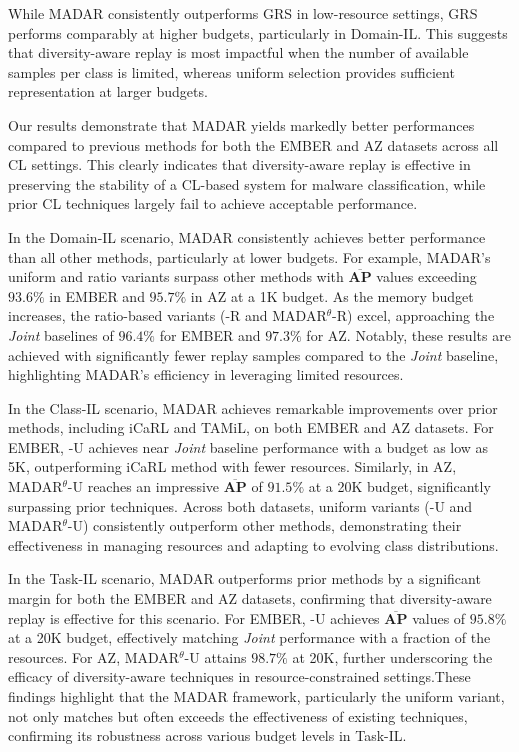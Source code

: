  While MADAR consistently outperforms GRS in low-resource settings, GRS performs comparably at higher budgets, particularly in Domain-IL. This suggests that diversity-aware replay is most impactful when the number of available samples per class is limited, whereas uniform selection provides sufficient representation at larger budgets.















Our results demonstrate that MADAR yields markedly better performances compared to previous methods for both the EMBER and AZ datasets across all CL settings. This clearly indicates that diversity-aware replay is effective in preserving the stability of a CL-based system for malware classification, while prior CL techniques largely fail to achieve acceptable performance.


In the Domain-IL scenario, MADAR consistently achieves better performance than all other methods, particularly at lower budgets. For example, MADAR's uniform and ratio variants surpass other methods with $\mathbf{\overline{AP}}$ values exceeding $93.6\%$ in EMBER and $95.7\%$ in AZ at a 1K budget. As the memory budget increases, the ratio-based variants (\system-R and MADAR$^\theta$-R) excel, approaching the \textit{Joint} baselines of $96.4\%$ for EMBER and $97.3\%$ for AZ. Notably, these results are achieved with significantly fewer replay samples compared to the \textit{Joint} baseline, highlighting MADAR's efficiency in leveraging limited resources.


In the Class-IL scenario, MADAR achieves remarkable improvements over prior methods, including iCaRL and TAMiL, on both EMBER and AZ datasets. For EMBER, \system-U achieves near \textit{Joint} baseline performance with a budget as low as 5K, outperforming iCaRL  method with fewer resources. Similarly, in AZ, MADAR$^\theta$-U reaches an impressive $\mathbf{\overline{AP}}$ of $91.5\%$ at a 20K budget, significantly surpassing prior techniques. Across both datasets, uniform variants (\system-U and MADAR$^\theta$-U) consistently outperform other methods, demonstrating their effectiveness in managing resources and adapting to evolving class distributions.


In the Task-IL scenario, MADAR outperforms prior methods by a significant margin for both the EMBER and AZ datasets, confirming that diversity-aware replay is effective for this scenario. For EMBER, \system-U achieves $\mathbf{\overline{AP}}$ values of $95.8\%$ at a 20K budget, effectively matching \textit{Joint} performance with a fraction of the resources. For AZ, MADAR$^\theta$-U attains $98.7\%$ at 20K, further underscoring the efficacy of diversity-aware techniques in resource-constrained settings.These findings highlight that the MADAR framework, particularly the uniform variant, not only matches but often exceeds the effectiveness of existing techniques, confirming its robustness across various budget levels in Task-IL.


